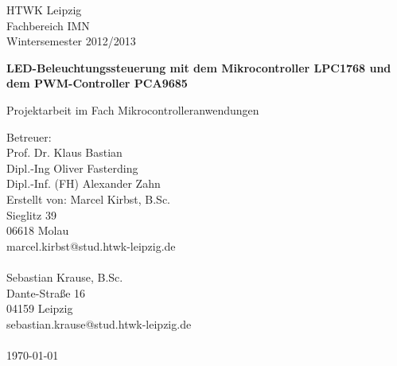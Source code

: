 \documentclass[a4paper,12pt]{scrartcl}
\begin{document}

\begin{titlepage}
HTWK Leipzig\\
Fachbereich IMN \\
Wintersemester 2012/2013




\begin{center}
\begin{Large}
\vfill {\textsf{\textbf{
LED-Beleuchtungssteuerung mit dem Mikrocontroller LPC1768 und dem PWM-Controller PCA9685
\\
}}}
\end{Large}
Projektarbeit im Fach Mikrocontrolleranwendungen
\end{center}

\begin{small}
\vfill
Betreuer:\\
Prof. Dr. Klaus Bastian\\
Dipl.-Ing Oliver Fasterding\\
Dipl.-Inf. (FH) Alexander Zahn\\
\vfill
Erstellt von:
Marcel Kirbst, B.Sc.\\
Sieglitz 39 \\
06618 Molau \\
marcel.kirbst@stud.htwk-leipzig.de\\
\\
Sebastian Krause, B.Sc.\\
Dante-Stra\ss{}e 16 \\
04159 Leipzig \\
sebastian.krause@stud.htwk-leipzig.de\\
\\
\today
\end{small}

\end{titlepage}
\end{document}
